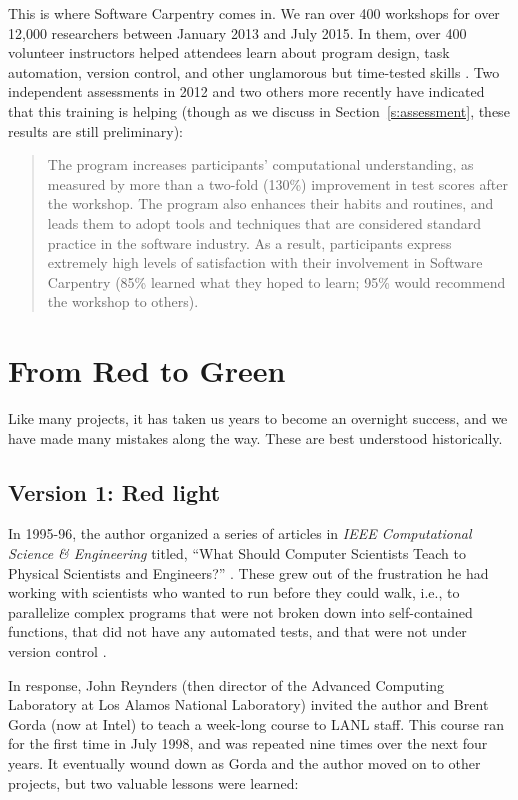 \documentclass[10pt,a4paper,twocolumn]{article}
\begin{document}
This is where Software Carpentry comes in. We ran over 400 workshops
for over 12,000 researchers between January 2013 and July 2015. In
them, over 400 volunteer instructors helped attendees learn about
program design, task automation, version control, and other
unglamorous but time-tested skills \cite{wilson2013}. Two independent
assessments in 2012 \cite{aranda2012,libarkin2012} and two others more
recently \cite{schossau2014,simperler2015} have indicated that this
training is helping (though as we discuss in
Section~\ref{s:assessment}, these results are still preliminary):

\begin{quote}
The program increases participants' computational understanding, as
measured by more than a two-fold (130\%) improvement in test scores
after the workshop. The program also enhances their habits and routines,
and leads them to adopt tools and techniques that are considered
standard practice in the software industry. As a result, participants
express extremely high levels of satisfaction with their involvement in
Software Carpentry (85\% learned what they hoped to learn; 95\% would
recommend the workshop to others).
\end{quote}

\section{From Red to Green}

Like many projects, it has taken us years to become an overnight
success, and we have made many mistakes along the way.  These are best
understood historically.

\subsection{Version 1: Red light}

In 1995-96, the author organized a series of articles in \emph{IEEE
Computational Science \& Engineering} titled, ``What Should Computer
Scientists Teach to Physical Scientists and Engineers?'' \cite{wilson1996}.
These grew out of the frustration he had working with scientists
who wanted to run before they could walk, i.e., to parallelize complex
programs that were not broken down into self-contained functions, that
did not have any automated tests, and that were not under version control
\cite{wilson2006a}.

In response, John Reynders (then director of the Advanced Computing
Laboratory at Los Alamos National Laboratory) invited the author and
Brent Gorda (now at Intel) to teach a week-long course to LANL staff.
This course ran for the first time in July 1998, and was repeated nine
times over the next four years. It eventually wound down as Gorda and
the author moved on to other projects, but two valuable lessons were
learned:
\end{document}
